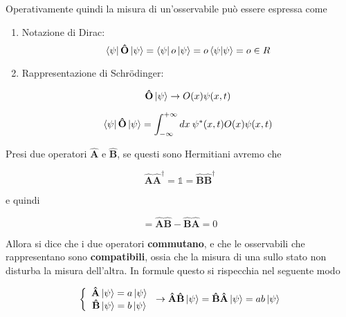 Operativamente quindi la misura di un'osservabile può essere espressa come

\begin{enumerate}
	\item Notazione di Dirac: 
	\begin{equation}
\bra{\psi}	\mathbf{\hat O} \ket{\psi}=\bra{\psi} o \ket{\psi}= o \braket{\psi | \psi}= o \in R
	\end{equation}
	\item Rappresentazione di Schrödinger:
	
	\begin{equation}
\mathbf{\hat O} \ket{\psi} \rightarrow O(x)\psi(x,t)
	\end{equation}
	
	\begin{equation}
\bra{\psi}	\mathbf{\hat O} \ket{\psi}= \int_{-\infty}^{+\infty}dx \: \psi^*(x,t)O(x)\psi(x,t)
\end{equation}
	
\end{enumerate}


Presi due operatori $\mathbf{\hat A}$ e $\mathbf{\hat B}$, se questi sono Hermitiani avremo che 

	\begin{equation}
\mathbf{\hat A}\mathbf{\hat A^\dagger}= \mathds{1} =\mathbf{\hat B}\mathbf{\hat B^\dagger}
\end{equation}

e quindi 

\begin{equation}
[\mathbf{\hat A},\mathbf{\hat B}]= \mathbf{\hat A}\mathbf{\hat B} - \mathbf{\hat B}\mathbf{\hat A}=0 
\end{equation}


Allora si dice che i due operatori \textbf{commutano}, e che le osservabili che rappresentano sono \textbf{compatibili}, ossia che la misura di una sullo stato non disturba la misura dell'altra. 
In formule questo si rispecchia nel seguente modo

\begin{equation}
\left\{\begin{array}{ccc}

\mathbf{\hat A} \ket{\psi}= a\ket{\psi} \\ \mathbf{\hat B} \ket{\psi}= b\ket{\psi} \end{array}\right. \rightarrow \mathbf{\hat A}\mathbf{\hat B}\ket{\psi}=\mathbf{\hat B}\mathbf{\hat A}\ket{\psi}=ab\ket{\psi}
\end{equation}

